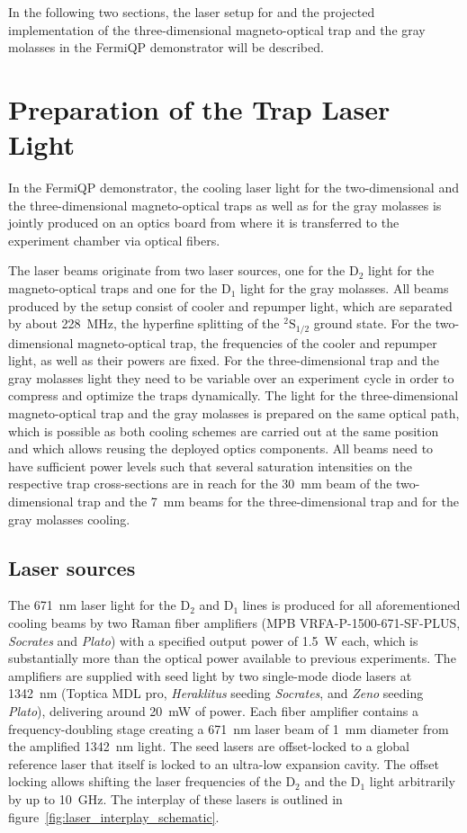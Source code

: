 In the following two sections, the laser setup for and the projected implementation of the three-dimensional magneto-optical trap and the gray molasses in the FermiQP demonstrator will be described.


\section{Preparation of the Trap Laser Light}\label{ch:light_preparation}
In the FermiQP demonstrator, the cooling laser light for the two-dimensional and the three-dimensional magneto-optical traps as well as for the gray molasses is jointly produced on an optics board from where it is transferred to the experiment chamber via optical fibers.

The laser beams originate from two laser sources, one for the D$_2$ light for the magneto-optical traps and one for the D$_1$ light for the gray molasses. All beams produced by the setup consist of cooler and repumper light, which are separated by about \SI{228}{\mega\hertz}, the hyperfine splitting of the $^2\text{S}_{1/2}$ ground state. For the two-dimensional magneto-optical trap, the frequencies of the cooler and repumper light, as well as their powers are fixed. For the three-dimensional trap and the gray molasses light they need to be variable over an experiment cycle in order to compress and optimize the traps dynamically. The light for the three-dimensional magneto-optical trap and the gray molasses is prepared on the same optical path, which is possible as both cooling schemes are carried out at the same position and which allows reusing the deployed optics components. All beams need to have sufficient power levels such that several saturation intensities on the respective trap cross-sections are in reach for the \SI{30}{\milli\meter} beam of the two-dimensional trap and the \SI{7}{\milli\meter} beams for the three-dimensional trap  and for the gray molasses cooling.

\subsection*{Laser sources}
The \SI{671}{\nano\meter} laser light for the D$_2$ and D$_1$ lines is produced for all aforementioned cooling beams by two Raman fiber amplifiers (MPB VRFA-P-1500-671-SF-PLUS, \textit{Socrates} and \textit{Plato}) with a specified output power of \SI{1.5}{\watt} each, which is substantially more than the optical power available to previous experiments. The amplifiers are supplied with seed light by two single-mode diode lasers at \SI{1342}{\nano\meter} (Toptica MDL pro, \textit{Heraklitus} seeding \textit{Socrates}, and \textit{Zeno} seeding \textit{Plato}), delivering around \SI{20}{\milli\watt} of power. Each fiber amplifier contains a frequency-doubling stage creating a \SI{671}{\nano\meter} laser beam of \SI{1}{\milli\meter} diameter from the amplified \SI{1342}{\nano\meter} light. The seed lasers are offset-locked to a global reference laser that itself is locked to an ultra-low expansion cavity. The offset locking allows shifting the laser frequencies of the D$_2$ and the D$_1$ light arbitrarily by up to \SI[]{10}{\giga\hertz}. The interplay of these lasers is outlined in figure~\ref{fig:laser_interplay_schematic}.

